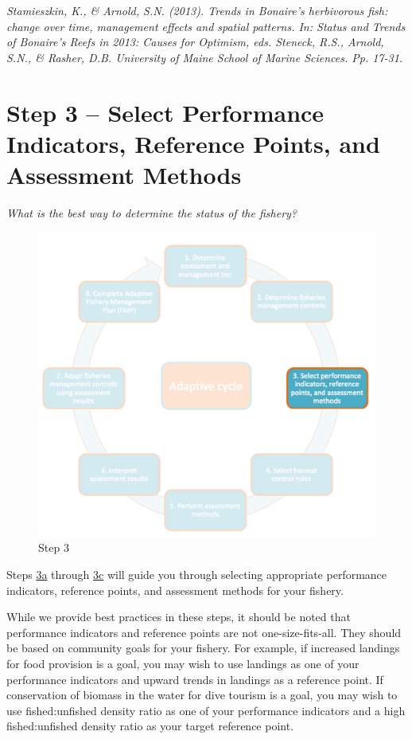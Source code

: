\documentclass[]{book}
\begin{document}
\emph{Stamieszkin, K., \& Arnold, S.N. (2013). Trends in Bonaire's
herbivorous fish: change over time, management effects and spatial
patterns. In: Status and Trends of Bonaire's Reefs in 2013: Causes for
Optimism, eds. Steneck, R.S., Arnold, S.N., \& Rasher, D.B. University
of Maine School of Marine Sciences. Pp. 17-31.}

\hypertarget{Step3}{\chapter{Step 3 -- Select Performance Indicators,
Reference Points, and Assessment Methods}\label{Step3}}

\emph{What is the best way to determine the status of the fishery?}

\begin{figure}
\centering
\includegraphics{myMediaFolder/media/Step3.png}
\caption{\label{fig:Step3}Step 3}
\end{figure}

Steps \protect\hyperlink{Step3a}{3a} through
\protect\hyperlink{Step3b}{3c} will guide you through selecting
appropriate performance indicators, reference points, and assessment
methods for your fishery.

While we provide best practices in these steps, it should be noted that
performance indicators and reference points are not one-size-fits-all.
They should be based on community goals for your fishery. For example,
if increased landings for food provision is a goal, you may wish to use
landings as one of your performance indicators and upward trends in
landings as a reference point. If conservation of biomass in the water
for dive tourism is a goal, you may wish to use fished:unfished density
ratio as one of your performance indicators and a high fished:unfished
density ratio as your target reference point.
\end{document}
